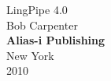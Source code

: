 \cleardoublepage
\pagestyle{empty}
\vspace*{1.125in}
\begin{center}
{\hfill{\fontsize{65}{95}\selectfont LingPipe 4.0}}
\\[0.75in]
{\hfill {\Huge Bob Carpenter}}
\\[-1pt]
\vfill
{\hfill {\large\bf Alias-i Publishing}}
\\[1pt]
{\hfill {\small New York}}
\\[-1pt]
{\hfill {\small 2010}}
\end{center}
